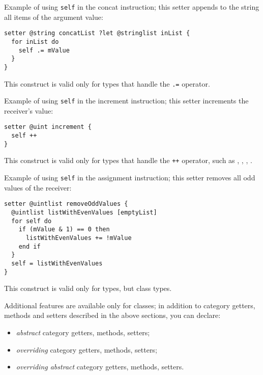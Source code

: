 Example of using \lstinline[language=galgas]!self! in the concat instruction; this setter appends to the string all items of the  argument value:
\begin{lstlisting}[language=galgas]
setter @string concatList ?let @stringlist inList {
  for inList do
    self .= mValue
  }
}
\end{lstlisting}
This construct is valid only for types that handle the \lstinline[language=galgas]!.=! operator.




Example of using \lstinline[language=galgas]!self! in the increment instruction; this setter increments the receiver's value:
\begin{lstlisting}[language=galgas]
setter @uint increment {
  self ++
}
\end{lstlisting}
This construct is valid only for types that handle the \lstinline[language=galgas]!++! operator, such as , , , .





Example of using \lstinline[language=galgas]!self! in the assignment instruction; this setter removes all odd values of the receiver:
\begin{lstlisting}[language=galgas]
setter @uintlist removeOddValues {
  @uintlist listWithEvenValues [emptyList]
  for self do
    if (mValue & 1) == 0 then
      listWithEvenValues += !mValue
    end if
  }
  self = listWithEvenValues
}
\end{lstlisting}
This construct is valid only for types, but class types.












Additional features are available only for classes; in addition to category getters, methods and setters described in the above sections, you can declare:
\begin{itemize}
\item \emph{abstract} category getters, methods, setters;
\item \emph{overriding} category getters, methods, setters;
\item \emph{overriding abstract} category getters, methods, setters.
\end{itemize}


